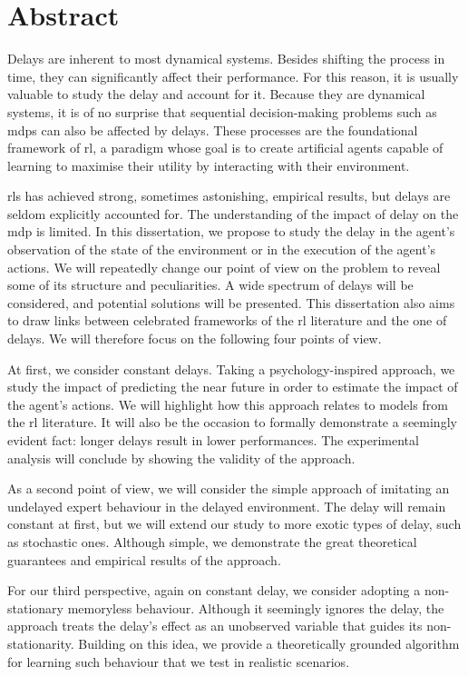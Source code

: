 \chapter*{Abstract}
 
Delays are inherent to most dynamical systems. 
Besides shifting the process in time, they can significantly affect their performance. 
For this reason, it is usually valuable to study the delay and account for it.
Because they are dynamical systems, it is of no surprise that sequential decision-making problems such as \glspl{mdp} can also be affected by delays.
These processes are the foundational framework of \gls{rl}, a paradigm whose goal is to create artificial agents capable of learning to maximise their utility by interacting with their environment.

\glspl{rl} has achieved strong, sometimes astonishing, empirical results, but delays are seldom explicitly accounted for. 
The understanding of the impact of delay on the \gls{mdp} is limited.
In this dissertation, we propose to study the delay in the agent's observation of the state of the environment or in the execution of the agent's actions.
We will repeatedly change our point of view on the problem to reveal some of its structure and peculiarities.
A wide spectrum of delays will be considered, and potential solutions will be presented.
This dissertation also aims to draw links between celebrated frameworks of the \gls{rl} literature and the one of delays.
We will therefore focus on the following four points of view. 

At first, we consider constant delays. Taking a psychology-inspired approach, we study the impact of predicting the near future in order to estimate the impact of the agent's actions.
We will highlight how this approach relates to models from the \gls{rl} literature. 
It will also be the occasion to formally demonstrate a seemingly evident fact: longer delays result in lower performances. 
The experimental analysis will conclude by showing the validity of the approach.

As a second point of view, we will consider the simple approach of imitating an undelayed expert behaviour in the delayed environment.
The delay will remain constant at first, but we will extend our study to more exotic types of delay, such as stochastic ones.
Although simple, we demonstrate the great theoretical guarantees and empirical results of the approach.

For our third perspective, again on constant delay, we consider adopting a non-stationary memoryless behaviour.
Although it seemingly ignores the delay, the approach treats the delay's effect as an unobserved variable that guides its non-stationarity.
Building on this idea, we provide a theoretically grounded algorithm for learning such behaviour that we test in realistic scenarios. 

